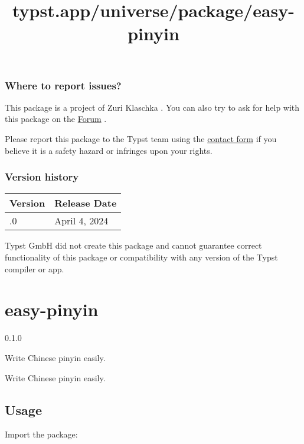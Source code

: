 \subsubsection{Where to report issues?}\label{where-to-report-issues}

This package is a project of Zuri Klaschka . You can also try to ask for
help with this package on the \href{https://forum.typst.app}{Forum} .

Please report this package to the Typst team using the
\href{https://typst.app/contact}{contact form} if you believe it is a
safety hazard or infringes upon your rights.

\label{versions}
\subsubsection{Version history}\label{version-history}

\begin{longtable}[]{@{}ll@{}}
\toprule\noalign{}
Version & Release Date \\
\midrule\noalign{}
\endhead
\bottomrule\noalign{}
\endlastfoot
0.1.0 & April 4, 2024 \\
\end{longtable}

Typst GmbH did not create this package and cannot guarantee correct
functionality of this package or compatibility with any version of the
Typst compiler or app.


\title{typst.app/universe/package/easy-pinyin}

\label{banner}
\section{easy-pinyin}\label{easy-pinyin}

{ 0.1.0 }

Write Chinese pinyin easily.

\label{readme}
Write Chinese pinyin easily.

\subsection{Usage}\label{usage}

Import the package:

\begin{Shaded}
\begin{Highlighting}[]
\end{Highlighting}
\end{Shaded}

